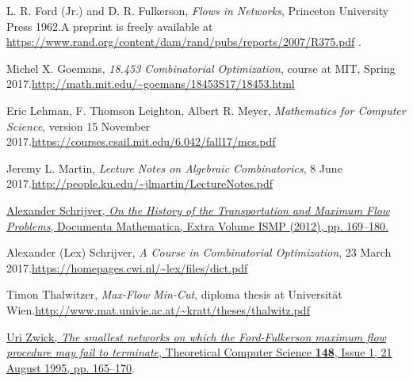 \documentclass[numbers=enddot,12pt,final,onecolumn,notitlepage]{scrartcl}%
\theoremstyle{definition}
\begin{document}
\begin{thebibliography}{99999999}                                                                                         %


L. R. Ford (Jr.) and D. R. Fulkerson,
\textit{Flows in Networks}, Princeton University Press 1962.\newline A
preprint is freely available at
\url{https://www.rand.org/content/dam/rand/pubs/reports/2007/R375.pdf} .

Michel X. Goemans, \textit{18.453 Combinatorial
Optimization}, course at MIT, Spring 2017.\newline\url{http://math.mit.edu/~goemans/18453S17/18453.html}

Eric Lehman, F. Thomson Leighton, Albert R. Meyer,
\textit{Mathematics for Computer Science}, version 15 November 2017.\newline\url{https://courses.csail.mit.edu/6.042/fall17/mcs.pdf}

Jeremy L. Martin, \textit{Lecture Notes on
Algebraic Combinatorics}, 8 June 2017.\newline\url{http://people.ku.edu/~jlmartin/LectureNotes.pdf}

%
\href{https://www.math.uni-bielefeld.de/documenta/vol-ismp/33_schrijver-alexander-tmf.pdf}{Alexander
Schrijver, \textit{On the History of the Transportation and Maximum Flow
Problems}, Documenta Mathematica, Extra Volume ISMP (2012), pp. 169--180.}

Alexander (Lex) Schrijver, \textit{A Course in
Combinatorial Optimization}, 23 March 2017.\newline\url{https://homepages.cwi.nl/~lex/files/dict.pdf}

Timon Thalwitzer, \textit{Max-Flow Min-Cut},
diploma thesis at Universit\"{a}t Wien.\newline\url{http://www.mat.univie.ac.at/~kratt/theses/thalwitz.pdf}

%
\href{https://doi.org/10.1016/0304-3975(95)00022-O}{Uri Zwick, \textit{The
smallest networks on which the Ford-Fulkerson maximum flow procedure may fail
to terminate}, Theoretical Computer Science \textbf{148}, Issue 1, 21 August
1995, pp. 165--170}.
\end{thebibliography}
\end{document}
